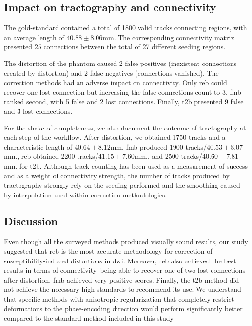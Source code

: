 \subsection{Impact on tractography and connectivity}

The gold-standard contained a total of 1800 valid tracks
connecting regions, with an average length of $40.88\pm8.06$mm.
The corresponding connectivity matrix presented 25 connections 
between the total of 27 different seeding regions.

The distortion of the phantom caused 2 false positives (inexistent 
connections created by distortion) and 2 false negatives 
(connections vanished). The correction methods had an adverse impact
on connectivity. Only \gls*{reb} could recover one lost connection
but increasing the false connections count to 3.
\gls*{fmb} ranked second, with 5 false and 2 lost connections.
Finally, \gls*{t2b} presented 9 false and 3 lost connections.

For the shake of completeness, we also document the outcome
of tractography at each step of the workflow. After distortion,
we obtained 1750 tracks and a characteristic length of 
$40.64\pm8.12$mm.
\gls*{fmb} produced 1900 tracks/$40.53\pm8.07$mm., \gls*{reb}
obtained 2200 tracks/$41.15\pm7.60$mm., and 2500 
tracks/$40.60\pm7.81$mm. for \gls*{t2b}. Although track counting has
been used as a measurement of success and as a weight of connectivity 
strength, the number of tracks produced by tractography strongly rely
on the seeding performed and the smoothing caused by interpolation used
within correction methodologies.

\subsection{Discussion}

Even though all the surveyed methods produced visually 
sound results, our study suggested that \gls*{reb} is the 
most accurate methodology for correction of susceptibility-induced
distortions in \gls*{dwi}. Moreover, \gls*{reb} also achieved
the best results in terms of connectivity, being able to recover
one of two lost connections after distortion. \Gls*{fmb} achieved 
very positive scores. Finally, the \gls*{t2b} method did not achieve
the necessary high-standards to recommend its use. We understand
that specific methods with anisotropic regularization that completely
restrict deformations to the phase-encoding direction would perform
significantly better compared to the standard method included
in this study.

